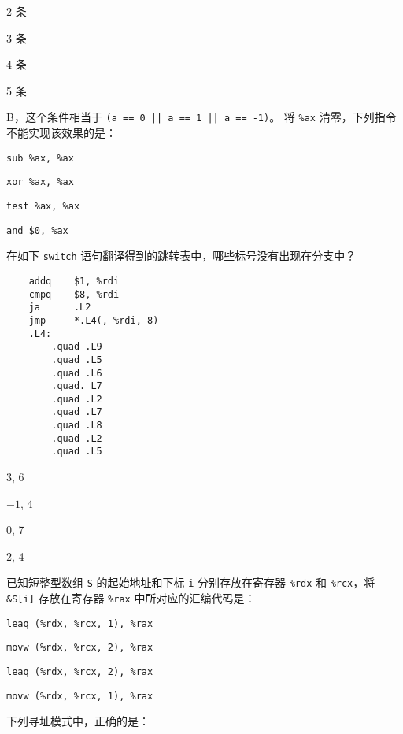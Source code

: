 \begin{problems}
        \begin{choices}
            \item 2 条
            \item 3 条
            \item 4 条
            \item 5 条
        \end{choices}
        \sol B，这个条件相当于 \verb+(a == 0 || a == 1 || a == -1)+。
         将 \verb|%ax| 清零，下列指令不能实现该效果的是：
        \begin{choices}
            \item \verb|sub %ax, %ax|
            \item \verb|xor %ax, %ax|
            \item \verb|test %ax, %ax|
            \item \verb|and $0, %ax|
        \end{choices}
         在如下 \verb|switch| 语句翻译得到的跳转表中，哪些标号没有出现在分支中？
        \begin{verbatim}
    addq    $1, %rdi
    cmpq    $8, %rdi
    ja      .L2
    jmp     *.L4(, %rdi, 8)
    .L4:
        .quad .L9
        .quad .L5
        .quad .L6
        .quad. L7
        .quad .L2
        .quad .L7
        .quad .L8
        .quad .L2
        .quad .L5
        \end{verbatim}
        \begin{choices}
            \item 3, 6
            \item $-1$, 4
            \item 0, 7
            \item 2, 4
        \end{choices}
         已知短整型数组 \verb|S| 的起始地址和下标 \verb|i| 分别存放在寄存器 \verb|%rdx| 和 \verb|%rcx|，将 \verb|&S[i]| 存放在寄存器 \verb|%rax| 中所对应的汇编代码是：
        \begin{choices}
            \item \verb|leaq (%rdx, %rcx, 1), %rax|
            \item \verb|movw (%rdx, %rcx, 2), %rax|
            \item \verb|leaq (%rdx, %rcx, 2), %rax|
            \item \verb|movw (%rdx, %rcx, 1), %rax|
        \end{choices}
         下列寻址模式中，正确的是：
        \begin{choices}

\end{choices}
\end{problems}
